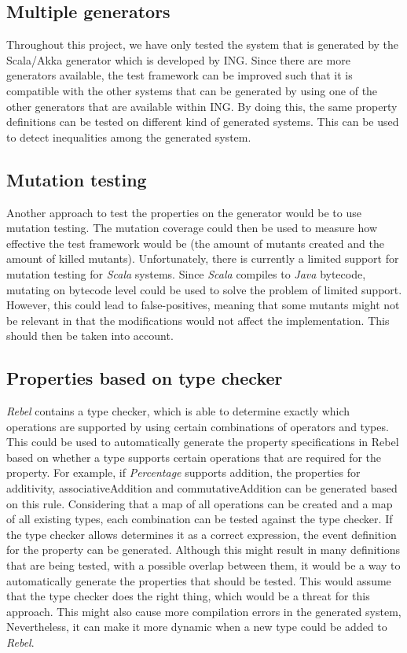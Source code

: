 \subsection*{Multiple generators}
Throughout this project, we have only tested the system that is generated by the Scala/Akka generator which is developed by ING. Since there are more generators available, the test framework can be improved such that it is compatible with the other systems that can be generated by using one of the other generators that are available within ING. By doing this, the same property definitions can be tested on different kind of generated systems. This can be used to detect inequalities among the generated system.

\subsection*{Mutation testing}
Another approach to test the properties on the generator would be to use mutation testing. The mutation coverage could then be used to measure how effective the test framework would be (the amount of mutants created and the amount of killed mutants). Unfortunately, there is currently a limited support for mutation testing for \textit{Scala} systems. Since \textit{Scala} compiles to \textit{Java} bytecode, mutating on bytecode level could be used to solve the problem of limited support. However, this could lead to false-positives, meaning that some mutants might not be relevant in that the modifications would not affect the implementation. This should then be taken into account.

\subsection*{Properties based on type checker}
\textit{Rebel} contains a type checker, which is able to determine exactly which operations are supported by using certain combinations of operators and types. This could be used to automatically generate the property specifications in Rebel based on whether a type supports certain operations that are required for the property. For example, if \textit{Percentage} supports addition, the properties for additivity, associativeAddition and commutativeAddition can be generated based on this rule. Considering that a map of all operations can be created and a map of all existing types, each combination can be tested against the type checker. If the type checker allows determines it as a correct expression, the event definition for the property can be generated. Although this might result in many definitions that are being tested, with a possible overlap between them, it would be a way to automatically generate the properties that should be tested. This would assume that the type checker does the right thing, which would be a threat for this approach. This might also cause more compilation errors in the generated system, Nevertheless, it can make it more dynamic when a new type could be added to \textit{Rebel}.
